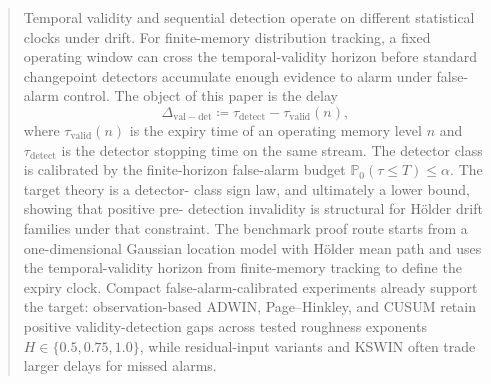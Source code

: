\begin{abstract}
Temporal validity and sequential detection operate on different statistical
clocks under drift. For finite-memory distribution tracking, a fixed operating
window can cross the temporal-validity horizon before standard changepoint
detectors accumulate enough evidence to alarm under false-alarm control. The
object of this paper is the delay
\[
  \Delta_{\mathrm{val-det}} \coloneqq \tau_{\mathrm{detect}} - \tau_{\mathrm{valid}}(n),
\]
where $\tau_{\mathrm{valid}}(n)$ is the expiry time of an operating memory level
$n$ and $\tau_{\mathrm{detect}}$ is the detector stopping time on the same
stream. The detector class is calibrated by the finite-horizon false-alarm
budget $\mathbb P_0(\tau \le T) \le \alpha$. The target theory is a detector-
class sign law, and ultimately a lower bound, showing that positive pre-
detection invalidity is structural for H\"older drift families under that
constraint. The benchmark proof route starts from a one-dimensional Gaussian
location model with H\"older mean path and uses the temporal-validity horizon
from finite-memory tracking to define the expiry clock. Compact
false-alarm-calibrated experiments already support the target:
observation-based ADWIN, Page--Hinkley, and CUSUM retain positive
validity-detection gaps across tested roughness exponents $H\in\{0.5,0.75,1.0\}$,
while residual-input variants and KSWIN often trade larger delays for missed
alarms.
\end{abstract}
